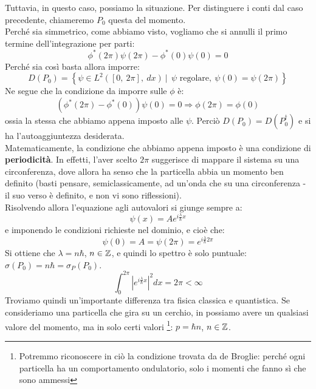 \documentclass[../../FisicaTeorica.tex]{subfiles}
\begin{document}
Tuttavia, in questo caso, possiamo  la situazione. Per distinguere i conti dal caso precedente, chiameremo $P_0$ questa  del momento.\\
Perché sia simmetrico, come abbiamo visto, vogliamo che si annulli il primo termine dell'integrazione per parti:
\[
\phi^\ast\left(2\pi\right)\psi\left(2\pi\right)-\phi^\ast\left(0\right)\psi \left(0\right)=0
\]
Perché sia così basta allora imporre:
\[
D\left(P_0\right)=\left\{\psi\in L^2\left(\left[0,\ 2\pi\right],\ dx\right)\ |\ \ \psi\text{ regolare},\ \psi\left(0\right)=\psi(2\pi)\right\}
\]
Ne segue che la condizione da imporre sulle $\phi$ è:
\[
\left(\phi^\ast\left(2\pi\right)-\phi^\ast\left(0\right)\right)\psi \left(0\right)=0\Rightarrow \phi \left(2\pi\right)=\phi \left(0\right)
\]
ossia la stessa che abbiamo appena imposto alle $\psi$. Perciò $D\left(P_0\right)=D\left(P_0^\dag\right)$ e si ha l'autoaggiuntezza desiderata.\\
Matematicamente, la condizione che abbiamo appena imposto è una condizione di \textbf{periodicità}. In effetti, l'aver scelto $2\pi$  suggerisce di mappare il sistema su una circonferenza, dove allora ha senso che la particella abbia un momento ben definito (basti pensare, semiclassicamente, ad un'onda che  su una circonferenza - il suo verso è definito, e non vi sono riflessioni).\\
Risolvendo allora l'equazione agli autovalori si giunge sempre a:
\[
\psi\left(x\right)=A e^{i\frac{\lambda}{\hbar}x}
\]
e imponendo le condizioni richieste nel dominio, e cioè che:
\[
\psi\left(0\right)=A= \psi \left(2\pi\right)=e^{i\frac{\lambda}{\hbar}2\pi}
\]
Si ottiene che $\lambda = n\hbar$, $n\in \mathbb{Z}$, e quindi lo spettro è solo puntuale: $\sigma(P_0) = n\hbar = \sigma_P(P_0)$.
\[
\int_{0}^{2\pi}{\left|e^{i\frac{\lambda}{\hbar}x}\right|^2dx=2\pi<\infty}
\]
Troviamo quindi un'importante differenza tra fisica classica e quantistica. Se consideriamo una particella che gira su un cerchio, in \MC possiamo avere un qualsiasi valore del momento, ma in \MQ solo certi valori \footnote{Potremmo riconoscere in ciò la condizione trovata da de Broglie: perché ogni particella ha un comportamento ondulatorio, solo i momenti che fanno sì che  sono ammessi}: $p=\hbar n$, $n\in \mathbb{Z}$.\\
\end{document}
